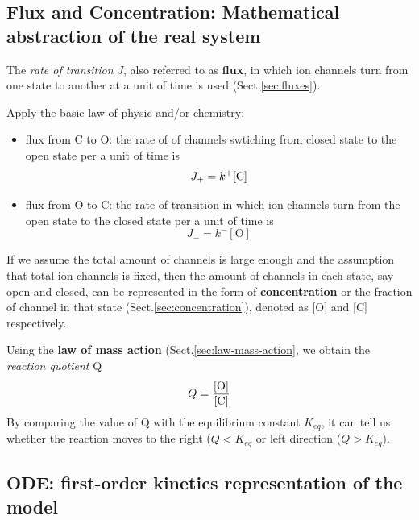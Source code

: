 \subsection{Flux and Concentration: Mathematical abstraction of the real system}
\label{sec:flux-example}
\label{sec:concentration-example}



The {\it rate of transition} $J$, also referred to as {\bf flux}, in which ion
channels turn from one state to another at a unit of time is used
(Sect.\ref{sec:fluxes}).
    
Apply the basic law of physic and/or chemistry:
  \begin{itemize}
  \item flux from C to O: the rate of of channels swtiching from closed state to
  the open state per a unit of time is
  \begin{equation}
  J_+ = k^+[{\text{C}}]
  \end{equation} 
    
    
   \item flux from O to C: the rate of transition in which ion channels turn
   from the open state to the closed state per a unit of time is
    \begin{equation}
    J_- = k^-[\text{O}]
    \end{equation}
\end{itemize}

If we assume the total amount of channels is large enough and the assumption
that total ion channels is fixed, then the amount of channels in each state, say
open and closed, can be represented in the form of {\bf concentration} or the
fraction of channel in that state (Sect.\ref{sec:concentration}), denoted as [O]
and [C] respectively.

Using the {\bf law of mass action} (Sect.\ref{sec:law-mass-action}, we obtain
the {\it reaction quotient} Q
    \begin{equation}
      \label{eq:8}
      Q = \frac{[\text{O}]}{[{\text{C}}]}
    \end{equation}
By comparing the value of Q with the equilibrium constant $K_{eq}$, it can tell
us whether the reaction moves to the right ($Q<K_{eq}$ or left direction ($Q>K_{eq}$).

\subsection{ODE: first-order kinetics representation of the model}
\label{sec:first-order-kinetics-example}

